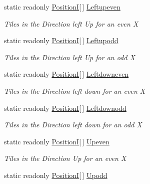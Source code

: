 \begin{DoxyCompactItemize}
\item 
static readonly \hyperlink{classCore_1_1Models_1_1PositionI}{Position\+I}\mbox{[}$\,$\mbox{]} \hyperlink{classClient_1_1Common_1_1Views_1_1MenuView_a89a9af01e575d4fd95b93697fd1c21da}{Leftupeven}
\begin{DoxyCompactList}\small\item\em Tiles in the Direction left Up for an even X \end{DoxyCompactList}\item 
static readonly \hyperlink{classCore_1_1Models_1_1PositionI}{Position\+I}\mbox{[}$\,$\mbox{]} \hyperlink{classClient_1_1Common_1_1Views_1_1MenuView_abf35d055ec05de9009e4537a25f94739}{Leftupodd}
\begin{DoxyCompactList}\small\item\em Tiles in the Direction left Up for an odd X \end{DoxyCompactList}\item 
static readonly \hyperlink{classCore_1_1Models_1_1PositionI}{Position\+I}\mbox{[}$\,$\mbox{]} \hyperlink{classClient_1_1Common_1_1Views_1_1MenuView_a9023c2bcec1cdb52198b9dc975fbc257}{Leftdowneven}
\begin{DoxyCompactList}\small\item\em Tiles in the Direction left down for an even X \end{DoxyCompactList}\item 
static readonly \hyperlink{classCore_1_1Models_1_1PositionI}{Position\+I}\mbox{[}$\,$\mbox{]} \hyperlink{classClient_1_1Common_1_1Views_1_1MenuView_a0a5f7440839d47bbd716627bd0efc576}{Leftdownodd}
\begin{DoxyCompactList}\small\item\em Tiles in the Direction left down for an odd X \end{DoxyCompactList}\item 
static readonly \hyperlink{classCore_1_1Models_1_1PositionI}{Position\+I}\mbox{[}$\,$\mbox{]} \hyperlink{classClient_1_1Common_1_1Views_1_1MenuView_ad5d3faf457e317d3c0757a13ff310e0c}{Upeven}
\begin{DoxyCompactList}\small\item\em Tiles in the Direction Up for an even X \end{DoxyCompactList}\item 
static readonly \hyperlink{classCore_1_1Models_1_1PositionI}{Position\+I}\mbox{[}$\,$\mbox{]} \hyperlink{classClient_1_1Common_1_1Views_1_1MenuView_abb38bb872b2393e613c4e9f20498a0b2}{Upodd}

\end{DoxyCompactItemize}
